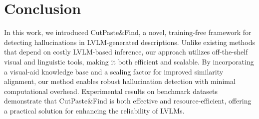 \section{Conclusion}

In this work, we introduced CutPaste\&Find, a novel, training-free framework for detecting hallucinations in LVLM-generated descriptions. Unlike existing methods that depend on costly LVLM-based inference, our approach utilizes off-the-shelf visual and linguistic tools, making it both efficient and scalable. By incorporating a visual-aid knowledge base and a scaling factor for improved similarity alignment, our method enables robust hallucination detection with minimal computational overhead. Experimental results on benchmark datasets demonstrate that CutPaste\&Find is both effective and resource-efficient, offering a practical solution for enhancing the reliability of LVLMs.